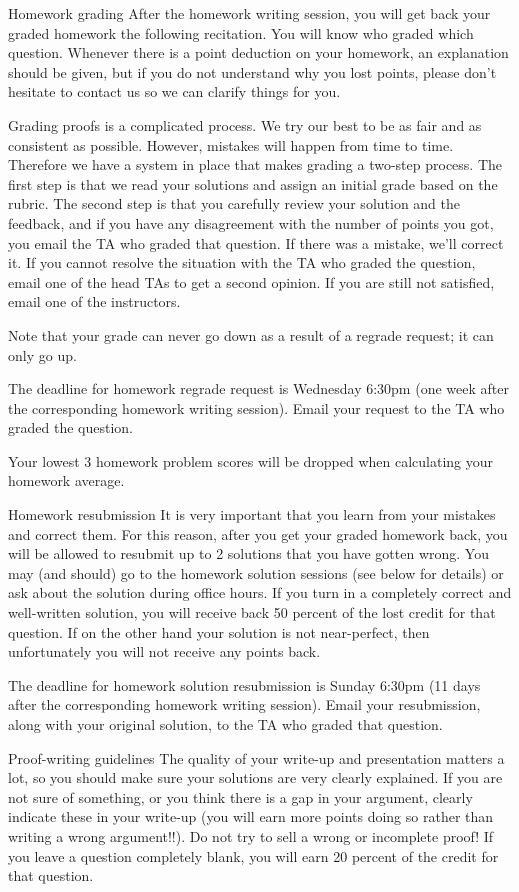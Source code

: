  
Homework grading
After the homework writing session, you will get back your graded homework the following recitation. You will know who graded which question. Whenever there is a point deduction on your homework, an explanation should be given, but if you do not understand why you lost points, please don’t hesitate to contact us so we can clarify things for you.

Grading proofs is a complicated process. We try our best to be as fair and as consistent as possible. However, mistakes will happen from time to time. Therefore we have a system in place that makes grading a two-step process. The first step is that we read your solutions and assign an initial grade based on the rubric. The second step is that you carefully review your solution and the feedback, and if you have any disagreement with the number of points you got, you email the TA who graded that question. If there was a mistake, we’ll correct it. If you cannot resolve the situation with the TA who graded the question, email one of the head TAs to get a second opinion. If you are still not satisfied, email one of the instructors.

Note that your grade can never go down as a result of a regrade request; it can only go up.

The deadline for homework regrade request is Wednesday 6:30pm (one week after the corresponding homework writing session). Email your request to the TA who graded the question.

Your lowest 3 homework problem scores will be dropped when calculating your homework average.

 
Homework resubmission
It is very important that you learn from your mistakes and correct them. For this reason, after you get your graded homework back, you will be allowed to resubmit up to 2 solutions that you have gotten wrong. You may (and should) go to the homework solution sessions (see below for details) or ask about the solution during office hours. If you turn in a completely correct and well-written solution, you will receive back 50 percent of the lost credit for that question. If on the other hand your solution is not near-perfect, then unfortunately you will not receive any points back.

The deadline for homework solution resubmission is Sunday 6:30pm (11 days after the corresponding homework writing session). Email your resubmission, along with your original solution, to the TA who graded that question.

 
Proof-writing guidelines
The quality of your write-up and presentation matters a lot, so you should make sure your solutions are very clearly explained. If you are not sure of something, or you think there is a gap in your argument, clearly indicate these in your write-up (you will earn more points doing so rather than writing a wrong argument!!). Do not try to sell a wrong or incomplete proof! If you leave a question completely blank, you will earn 20 percent of the credit for that question.

